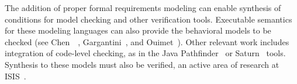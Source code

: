 The addition of proper formal requirements modeling can enable synthesis of conditions for model checking and other verification tools.  Executable semantics for these modeling languages can also provide the behavioral models to be checked (see Chen~\cite{SU_TA}~\cite{SU_MT}, Gargantini~\cite{ASM_SPIN}, and Ouimet~\cite{TASM_SAT}).  Other relevant work includes integration of code-level checking, as in the Java Pathfinder~\cite{Pathfinder} or Saturn~\cite{Stanford_Saturn} tools.  Synthesis to these models must also be verified, an active area of research at ISIS~\cite{ananth:2006}.
